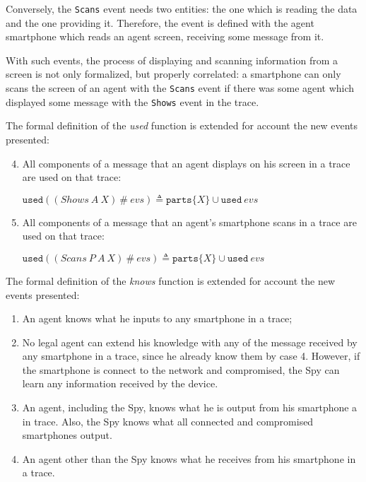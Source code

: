 Conversely, the \texttt{Scans} event needs two entities: the one which is reading the data and the one providing it. Therefore, the event is defined with the agent smartphone which reads an agent screen, receiving some message from it.

With such events, the process of displaying and scanning information from a screen is not only formalized, but properly correlated: a smartphone can only scans the screen of an agent with the \texttt{Scans} event if there was some agent which displayed some message with the \texttt{Shows} event in the trace.

The formal definition of the \textit{used} function is extended for account the new events presented:

\begin{enumerate}
  \setcounter{enumi}{3}
  \item All components of a message that an agent displays on his screen in a trace are used on that trace:
  \begin{center}
    $\texttt{used}((Shows\ A\ X)\ \# \ evs) \triangleq \texttt{parts}\{X\} \cup \texttt{used} \ evs$
  \end{center}
  \item All components of a message that an agent's smartphone scans in a trace are used on that trace:
  \begin{center}
    $\texttt{used}((Scans\ P\ A\ X)\ \# \ evs) \triangleq \texttt{parts}\{X\} \cup \texttt{used} \ evs$
  \end{center}
\end{enumerate}


The formal definition of the \textit{knows} function is extended for account the new events presented:
\begin{enumerate}
  \item An agent knows what he inputs to any smartphone in a trace;

  \item No legal agent can extend his knowledge with any of the message received by any smartphone in a trace, since he already know them by case 4. However, if the smartphone is connect to the network and compromised, the Spy can learn any information received by the device.

  \item An agent, including the Spy, knows what he is output from his smartphone a in trace. Also, the Spy knows what all connected and compromised smartphones output.

  \item An agent other than the Spy knows what he receives from his smartphone in a trace.
\end{enumerate}


